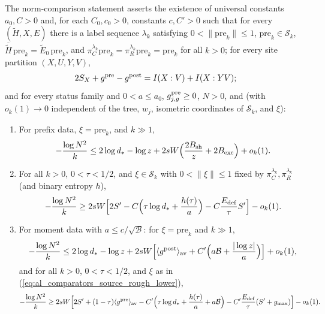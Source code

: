 \begin{definition}
    The norm-comparison statement asserts the existence of universal constants $a_0,C>0$ and, for each $C_0,c_0>0$, constants $c,C'>0$ such that for every $(\widetilde H,X,E)$ there is a label sequence $\lambda_k$ satisfying $0<\|\mathrm{pre}_k\|\le1$, $\mathrm{pre}_k\in\mathcal S_k$, $\overline{\widetilde H}\,\mathrm{pre}_k=\widetilde E_0\,\mathrm{pre}_k$, and $\pi_C^{\lambda_k}\mathrm{pre}_k=\pi_R^{\lambda_k}\mathrm{pre}_k=\mathrm{pre}_k$ for all $k>0$; for every site partition $(X,U,Y,V)$,
    \begin{align}
        2S_X+g^{\rm pre}-g^{\rm post}=I(X:V)+I(X:YV);
        \label{eq:al_comparators_source_identity}
    \end{align}
    and for every status family and $0<a\le a_0$, $g^{\rm pre}_{j,g}\ge0$, $N>0$, and (with $o_k(1)\to0$ independent of the tree, $w_j$, isometric coordinates of $\mathcal S_k$, and $\xi$):
    \begin{enumerate}
        \item For prefix data, $\xi=\mathrm{pre}_k$, and $k\gg1$,
              \begin{align}
                  -\frac{\log N^2}{k}\le2\log d_*-\log z
                  +2sW\Bigl(\frac{2B_{\rm sh}}z+2B_{\rm exc}\Bigr)+o_k(1).
                  \label{eq:al_comparators_source_rough_upper}
              \end{align}
        \item For all $k>0$, $0<\tau<1/2$, and $\xi\in\mathcal S_k$ with $0<\|\xi\|\le1$ fixed by $\pi_C^{\lambda_k},\pi_R^{\lambda_k}$ (and binary entropy $h$),
              \begin{align}
                  -\frac{\log N^2}{k}\ge2sW\Bigl[2S'
                      -C\Bigl(\tau\log d_*+\frac{h(\tau)}a\Bigr)
                      -C\frac{E_{\rm def}}{\tau}S'\Bigr]-o_k(1).
                  \label{eq:al_comparators_source_rough_lower}
              \end{align}
        \item For moment data with $a\le c/\sqrt{\mathcal B}$: for $\xi=\mathrm{pre}_k$ and $k\gg1$,
              \begin{align}
                  -\frac{\log N^2}{k}\le2\log d_*-\log z
                  +2sW\Bigl[\langle g^{\rm post}\rangle_{\rm av}
                      +C'\Bigl(a\mathcal B+\frac{|\log z|}a\Bigr)\Bigr]+o_k(1),
                  \label{eq:al_comparators_source_sharp_upper}
              \end{align}
              and for all $k>0$, $0<\tau<1/2$, and $\xi$ as in (\ref{eq:al_comparators_source_rough_lower}),
              \begin{align}
                  -\frac{\log N^2}{k}\ge2sW\Bigl[2S'+(1-\tau)
                      \langle g^{\rm pre}\rangle_{\rm av}
                      -C'\Bigl(\tau\log d_*+\frac{h(\tau)}a+a\mathcal B\Bigr)
                      -C'\frac{E_{\rm def}}\tau(S'+g_{\max})\Bigr]-o_k(1).
                  \label{eq:al_comparators_source_sharp_lower}
              \end{align}
    \end{enumerate}
\end{definition}

